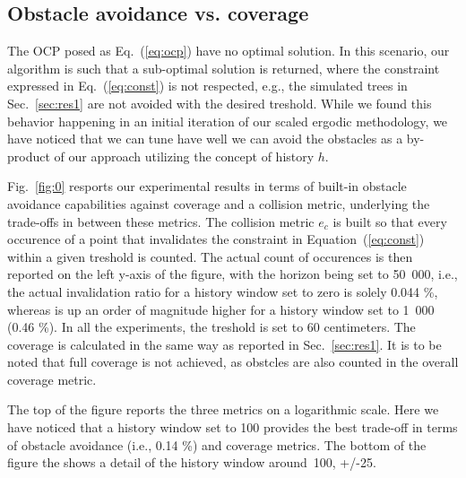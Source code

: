 \documentclass[letterpaper,10pt,conference,twoside]{IEEEtran}
\theoremstyle{definition}
\begin{document}
\subsection{Obstacle avoidance vs. coverage}\label{sec:res2}
\noindent
The OCP posed as Eq.~(\ref{eq:ocp}) have no optimal solution. In this scenario, our algorithm is such that a sub-optimal solution is returned, where the constraint expressed in Eq.~(\ref{eq:const}) is not respected, e.g., the simulated trees in Sec.~\ref{sec:res1} are not avoided with the desired treshold. 
While we found this behavior happening in an initial iteration of our scaled ergodic methodology, we have noticed that we can tune have well we can avoid the obstacles as a by-product of our approach utilizing the concept of history $h$. 

Fig.~\ref{fig:0} resports our experimental results in terms of built-in obstacle avoidance capabilities against coverage and a collision metric, underlying the trade-offs in between these metrics. The collision metric $e_c$ is built so that every occurence of a point that invalidates the constraint in Equation~(\ref{eq:const}) within a given treshold is counted. The actual count of occurences is then reported on the left y-axis of the figure, with the horizon being set to 50~000, i.e., the actual invalidation ratio for a history window set to zero is solely 0.044 \%, whereas is up an order of magnitude higher for a history window set to 1~000 (0.46 \%). In all the experiments, the treshold is set to 60 centimeters.
The coverage is calculated in the same way as reported in Sec.~\ref{sec:res1}. It is to be noted that full coverage is not achieved, as obstcles are also counted in the overall coverage metric.

The top of the figure reports the three metrics on a logarithmic scale. Here we have noticed that a history window set to 100 provides the best trade-off in terms of obstacle avoidance (i.e., 0.14 \%) and coverage metrics. The bottom of the figure the shows a detail of the history window around~100, +/-25.
\end{document}
